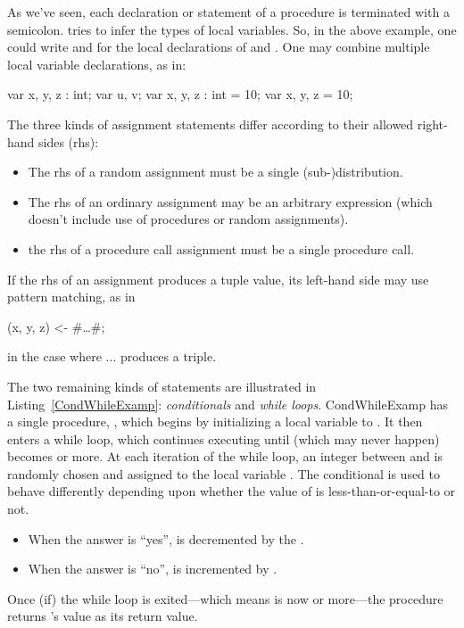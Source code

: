 As we've seen, each declaration or statement of a procedure is
terminated with a semicolon.  \EasyCrypt tries to infer the types of
local variables. So, in the above example, one could write 
and  for the local declarations of  and .
One may combine multiple local variable declarations, as in:
\begin{easycrypt}{}{}
var x, y, z : int;
var u, v;
var x, y, z : int = 10;
var x, y, z = 10;
\end{easycrypt}
The three kinds of assignment statements differ according to their
allowed right-hand sides (rhs):
\begin{itemize}
\item The rhs of a random assignment must be a single
  (sub-)distribution.

\item The rhs of an ordinary assignment may be an arbitrary expression
  (which doesn't include use of procedures or random assignments).

\item the rhs of a procedure call assignment must be a single procedure
  call.  
\end{itemize}
If the rhs of an assignment produces a tuple value, its left-hand side
may use pattern matching, as in
\begin{easycrypt}{}{}
(x, y, z) <- #\ldots#;
\end{easycrypt}
in the case where $\ldots$ produces a triple.

The two remaining kinds of statements are illustrated in
Listing~\ref{CondWhileExamp}: \emph{conditionals} and \emph{while
  loops}.
 {}{CondWhileExamp}
 has a single procedure,
, which begins by initializing a local variable  to
. It then enters a while loop, which continues executing until
(which may never happen)  becomes  or more. At each
iteration of the while loop, an integer between  and  is
randomly chosen and assigned to the local variable . The
conditional is used to behave differently depending upon whether the
value of  is less-than-or-equal-to  or not.
\begin{itemize}
\item When the answer is ``yes'',  is decremented by the .

\item When the answer is ``no'',  is incremented by .
\end{itemize}
Once (if) the while loop is exited---which means  is now 
or more---the procedure returns 's value as its return value.


